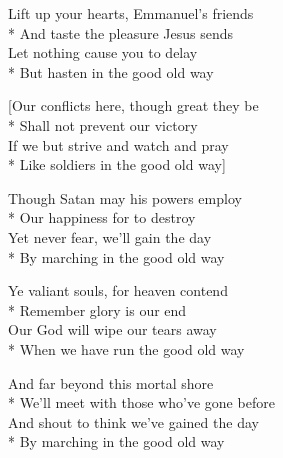 

\versemark
Lift up your hearts, Emmanuel’s friends\\*
And taste the pleasure Jesus sends\\
Let nothing cause you to delay\\*
But hasten in the good old way


[Our conflicts here, though great they be\\*
Shall not prevent our victory\\
If we but strive and watch and pray\\*
Like soldiers in the good old way]

\versemark
Though Satan may his powers employ\\*
Our happiness for to destroy\\
Yet never fear, we’ll gain the day\\*
By marching in the good old way

\versemark
Ye valiant souls, for heaven contend\\*
Remember glory is our end\\
Our God will wipe our tears away\\*
When we have run the good old way

\versemark
And far beyond this mortal shore\\*
We’ll meet with those who’ve gone before\\
And shout to think we’ve gained the day\\*
By marching in the good old way

